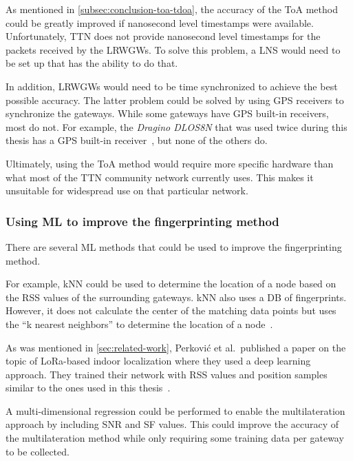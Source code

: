 As mentioned in \cref{subsec:conclusion-toa-tdoa}, the accuracy of the \ac{ToA} method could be greatly improved if nanosecond level timestamps were available.
Unfortunately, \ac{TTN} does not provide nanosecond level timestamps for the packets received by the \aclp{LRWGW}.
To solve this problem, a \ac{LNS} would need to be set up that has the ability to do that.

In addition, \aclp{LRWGW} would need to be time synchronized to achieve the best possible accuracy.
The latter problem could be solved by using \ac{GPS} receivers to synchronize the gateways.
While some gateways have \ac{GPS} built-in receivers, most do not.
For example, the \emph{Dragino DLOS8N} that was used twice during this thesis has a \ac{GPS} built-in receiver~\cite{dragino_technology_co_ltd_dlos8n_2023}, but none of the others do.

Ultimately, using the \ac{ToA} method would require more specific hardware than what most of the \ac{TTN} community network currently uses.
This makes it unsuitable for widespread use on that particular network.

\subsubsection{Using \acl{ML} to improve the fingerprinting method}

There are several \ac{ML} methods that could be used to improve the fingerprinting method.

For example, \ac{kNN} could be used to determine the location of a node based on the \ac{RSS} values of the surrounding gateways.
\ac{kNN} also uses a \ac{DB} of fingerprints.
However, it does not calculate the center of the matching data points but uses the ``k nearest neighbors'' to determine the location of a node~\cite{anagnostopoulos_reproducible_2019}.

As was mentioned in \cref{sec:related-work}, Perković et al.\ published a paper on the topic of \ac{LoRa}-based indoor localization where they used a deep learning approach.
They trained their network with \ac{RSS} values and position samples similar to the ones used in this thesis~\cite{perkovic_machine_2023}.

A multi-dimensional regression could be performed to enable the multilateration approach by including \ac{SNR} and \ac{SF} values.
This could improve the accuracy of the multilateration method while only requiring some training data per gateway to be collected.

